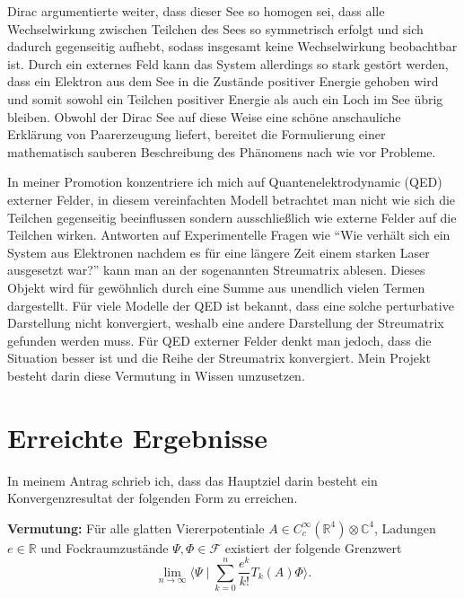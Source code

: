 \documentclass[a4paper,12pt]{article}
\begin{document}
Dirac argumentierte weiter\cite{theoriedupositron}, dass dieser See so homogen sei, dass alle Wechselwirkung zwischen 
Teilchen des Sees so symmetrisch erfolgt und sich dadurch gegenseitig aufhebt, sodass insgesamt keine Wechselwirkung 
beobachtbar ist. Durch ein externes Feld kann das System allerdings so stark gestört werden, dass ein Elektron aus dem
See in die Zustände positiver Energie gehoben wird und somit sowohl ein Teilchen positiver Energie als auch ein Loch
im See übrig bleiben. Obwohl der Dirac See auf diese Weise eine schöne anschauliche Erklärung von Paarerzeugung liefert,
bereitet die Formulierung einer mathematisch sauberen Beschreibung des Phänomens nach wie vor Probleme. 

In meiner Promotion konzentriere ich mich auf Quantenelektrodynamic (QED) externer Felder, in diesem vereinfachten Modell 
betrachtet man nicht wie sich die Teilchen gegenseitig beeinflussen sondern ausschließlich wie externe Felder auf die Teilchen
wirken. Antworten auf Experimentelle Fragen wie ``Wie verhält sich ein System aus Elektronen nachdem es für eine längere 
Zeit einem starken Laser ausgesetzt war?'' kann man an der sogenannten Streumatrix ablesen. Dieses Objekt wird für 
gewöhnlich durch eine Summe aus unendlich vielen Termen dargestellt. Für viele Modelle der QED ist bekannt,
dass eine solche perturbative Darstellung nicht konvergiert, weshalb eine andere Darstellung der Streumatrix gefunden
werden muss. Für QED externer Felder denkt man jedoch\cite{mickelsson}, dass die Situation besser ist und 
die Reihe der Streumatrix konvergiert. Mein Projekt besteht darin diese Vermutung in Wissen umzusetzen.

\section{Erreichte Ergebnisse}

In meinem Antrag schrieb ich, dass das Hauptziel darin besteht ein Konvergenzresultat der folgenden Form zu erreichen. 

{\bfseries Vermutung:}
Für alle glatten Viererpotentiale \(A\in C_c^\infty(\mathbb{R}^4)\otimes \mathbb{C}^4\), Ladungen \(e\in\mathbb{R}\)
und Fockraumzustände \(\Psi,\Phi\in \mathcal{F}\) existiert der folgende Grenzwert
\begin{equation}\label{Ziel}
\lim_{n\rightarrow \infty} \langle \Psi\mid \sum_{k=0}^n \frac{e^k}{k!} T_k(A) \Phi \rangle.
\end{equation}
\end{document}
